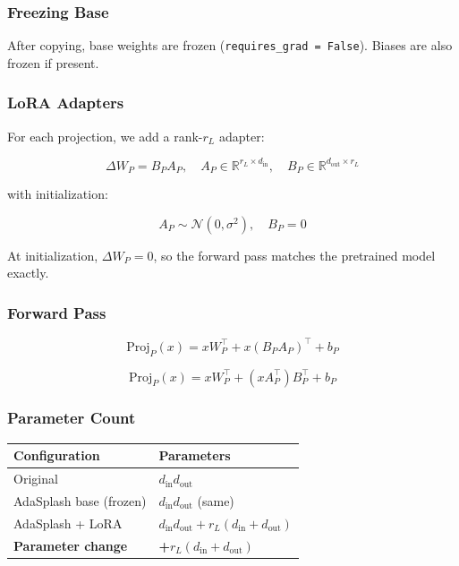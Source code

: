 \subsubsection{Freezing Base}

After copying, base weights are frozen (\texttt{requires\_grad = False}). Biases are 
also frozen if present.

\subsubsection{LoRA Adapters}

For each projection, we add a rank-$r_L$ adapter:

\[
\Delta W_P = B_P A_P, \quad A_P \in \mathbb{R}^{r_L \times d_\text{in}}, \quad B_P \in \mathbb{R}^{d_\text{out} \times r_L}
\tag{4.3}
\]

with initialization:

\[
A_P \sim \mathcal{N}(0, \sigma^2), \quad B_P = 0
\tag{4.4}
\]

At initialization, $\Delta W_P = 0$, so the forward pass matches the 
pretrained model exactly.

\subsubsection{Forward Pass}

\[
\text{Proj}_P(x) = x W_P^\top + x (B_P A_P)^\top + b_P
\tag{4.5}
\]

\[
\text{Proj}_P(x) = x W_P^\top + (x A_P^\top) B_P^\top + b_P
\tag{4.6}
\]

\subsubsection{Parameter Count}

\begin{table}[H]
\centering
\small
\begin{tabular}{ll}
\toprule
\textbf{Configuration} & \textbf{Parameters} \\
\midrule
Original & $d_\text{in} d_\text{out}$ \\
AdaSplash base (frozen) & $d_\text{in} d_\text{out}$ (same) \\
AdaSplash + LoRA & $d_\text{in} d_\text{out} + r_L (d_\text{in} + d_\text{out})$ \\
\textbf{Parameter change} & \textbf{+$r_L (d_\text{in} + d_\text{out})$} \\
\bottomrule
\end{tabular}
\end{table}

